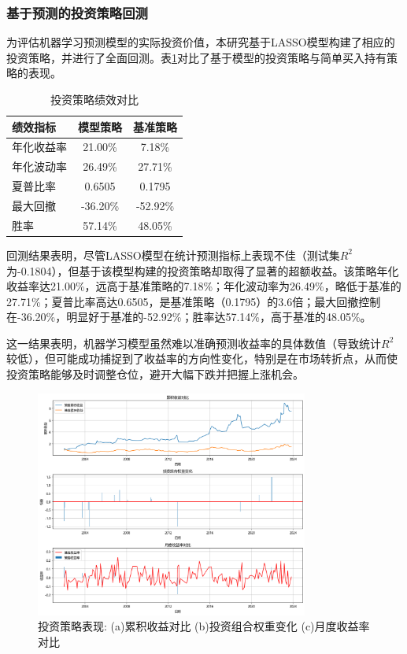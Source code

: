 \documentclass[12pt, a4paper]{article}
\begin{document}
\subsubsection{基于预测的投资策略回测}

为评估机器学习预测模型的实际投资价值，本研究基于LASSO模型构建了相应的投资策略，并进行了全面回测。表\ref{tab:backtest_results}对比了基于模型的投资策略与简单买入持有策略的表现。

\begin{table}[htbp]
\centering
\caption{投资策略绩效对比}
\label{tab:backtest_results}
\begin{tabular}{lcc}
\toprule
绩效指标 & 模型策略 & 基准策略 \\
\midrule
年化收益率 & 21.00\% & 7.18\% \\
年化波动率 & 26.49\% & 27.71\% \\
夏普比率 & 0.6505 & 0.1795 \\
最大回撤 & -36.20\% & -52.92\% \\
胜率 & 57.14\% & 48.05\% \\
\bottomrule
\end{tabular}
\end{table}

回测结果表明，尽管LASSO模型在统计预测指标上表现不佳（测试集$R^2$为-0.1804），但基于该模型构建的投资策略却取得了显著的超额收益。该策略年化收益率达21.00\%，远高于基准策略的7.18\%；年化波动率为26.49\%，略低于基准的27.71\%；夏普比率高达0.6505，是基准策略（0.1795）的3.6倍；最大回撤控制在-36.20\%，明显好于基准的-52.92\%；胜率达57.14\%，高于基准的48.05\%。

这一结果表明，机器学习模型虽然难以准确预测收益率的具体数值（导致统计$R^2$较低），但可能成功捕捉到了收益率的方向性变化，特别是在市场转折点，从而使投资策略能够及时调整仓位，避开大幅下跌并把握上涨机会。

\begin{figure}[htbp]
\centering
\includegraphics[width=0.8\textwidth]{./img/投资策略表现组合图.png}
\caption{投资策略表现: (a)累积收益对比 (b)投资组合权重变化 (c)月度收益率对比}
\label{fig:strategy_performance_plots}
\end{figure}
\end{document}
